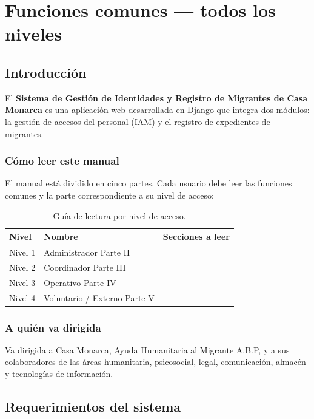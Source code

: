 \documentclass[10pt,letterpaper]{report}
\newcommand{\paratodos}{%
  \par\smallskip\noindent
  \fbox{\small\bfseries\ Todos los niveles\ }%
  \par\medskip}
\begin{document}
\part{Funciones comunes --- todos los niveles}

\chapter{Introducción}
\paratodos

El \textbf{Sistema de Gestión de Identidades y Registro de Migrantes de Casa Monarca} es una aplicación web desarrollada en Django que integra dos módulos: la gestión de accesos del personal (IAM) y el registro de expedientes de migrantes.

\section*{Cómo leer este manual}
El manual está dividido en cinco partes. Cada usuario debe leer las funciones comunes y la parte correspondiente a su nivel de acceso:

\begin{table}[H]\centering
\caption{Guía de lectura por nivel de acceso.}
\label{tab:lectura}
\begin{tabularx}{\textwidth}{l l X}
\toprule
\textbf{Nivel} & \textbf{Nombre} & \textbf{Secciones a leer}\\
\midrule
Nivel 1 & Administrador Parte II\\
Nivel 2 & Coordinador Parte III\\
Nivel 3 & Operativo Parte IV\\
Nivel 4 & Voluntario / Externo Parte V\\
\bottomrule
\end{tabularx}
\end{table}

\section*{A quién va dirigida}
Va dirigida a Casa Monarca, Ayuda Humanitaria al Migrante A.B.P, y a sus colaboradores de las áreas humanitaria, psicosocial, legal, comunicación, almacén y tecnologías de información.



\chapter{Requerimientos del sistema}
\end{document}
